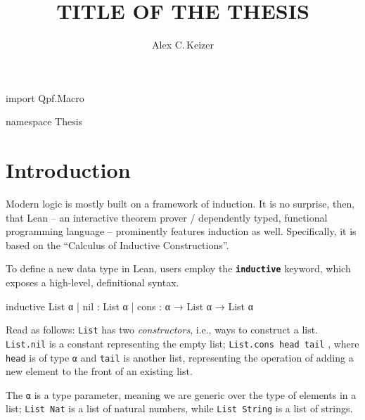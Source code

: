 \documentclass[titlepage]{report}
\newenvironment{leanhidden}{\expandafter\comment}{\expandafter\endcomment}
\newcommand\lean[1]{{%
\def\leanmode{1}%
\small \texttt{#1}%
\undef\leanmode%
}}
\newcommand\keyword[1]{{\color{keywordcolor} \textbf{\lean{#1}}}}
\newcommand\inductive{{\keyword{inductive}}}
\begin{document}
%
%
\title{TITLE OF THE THESIS}
\author{Alex C.\,Keizer}
\maketitle


\begin{leanhidden}
    import Qpf.Macro

    namespace Thesis
\end{leanhidden}

%
%
\chapter{Introduction}
\label{ch:intro}

Modern logic is mostly built on a framework of induction.
It is no surprise, then, that Lean -- an interactive theorem prover / dependently typed, functional programming language -- prominently features induction as well.
Specifically, it is based on the ``Calculus of Inductive Constructions''.\cite{avigadTheoremProvingLean}

To define a new data type in Lean, users employ the \inductive{} keyword, which exposes a high-level, definitional syntax.

\begin{leancode}
    inductive List α 
    | nil  : List α
    | cons : α → List α → List α
\end{leancode}

Read as follows: \lean{List} has two \emph{constructors}, i.e., ways to construct a list.
\lean{List.nil} is a constant
representing the empty list; 
\lean{List.cons head tail}, where \lean{head} is of type \lean{α} and \lean{tail} is another list, representing the operation of adding a new element to the front of an existing list.

The \lean{α} is a type parameter, meaning we are generic over the type of elements in a list; \lean{List Nat} is a list of natural numbers, while \lean{List String} is a list of strings.
\end{document}
